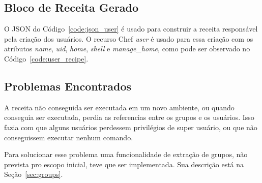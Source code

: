 \subsection{Bloco de Receita Gerado}

O JSON do Código~\ref{code:json_user} é usado para construir a receita responsável pela
criação dos usuários. O recurso Chef \textit{user} é usado para essa criação com
os atributos \textit{name}, \textit{uid}, \textit{home}, \textit{shell} e 
\textit{manage\_home}, como pode ser observado no Código~\ref{code:user_recipe}.

\noindent\begin{minipage}{\textwidth}
  \lstset{style=shell}
  
\end{minipage}\hfill

\subsection{Problemas Encontrados}
A receita não conseguida ser executada em um novo ambiente, ou quando conseguia
ser executada, perdia as referencias entre os grupos e os usuários. Isso fazia
com que alguns usuários perdessem privilégios de super usuário, ou que não
conseguissem executar nenhum comando.

Para solucionar esse problema uma funcionalidade de extração de grupos, não prevista
pro escopo inicial, teve que ser implementada. Sua descrição está na Seção~\ref{sec:groups}.
